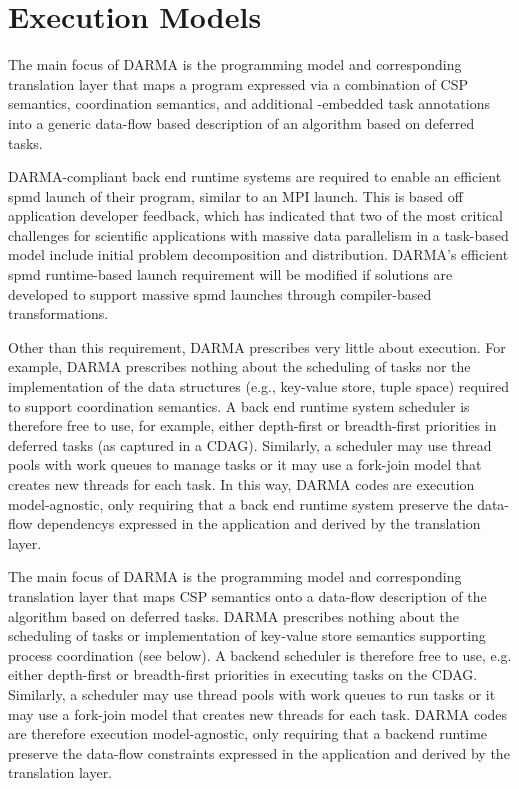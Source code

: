 

\section{Execution Models}
\label{sec:exec_model}
The main focus of \gls{DARMA} is the \gls{programming model} and corresponding
\gls{translation layer} that maps a program expressed via a combination of
\gls{CSP} semantics, \gls{coordination semantics}, and additional \CC{}-embedded task annotations into a generic data-flow based
description of an algorithm based on deferred tasks.

\gls{DARMA}-compliant \gls{back end} \gls{runtime systems} are required to enable an efficient
\gls{spmd} launch of their program, similar to an MPI launch.
This is based off application developer feedback, which has indicated that 
two of the most critical challenges for scientific applications with massive data parallelism in a task-based model
include initial problem decomposition and distribution.
\gls{DARMA}'s efficient \gls{spmd} runtime-based launch requirement 
will be modified if solutions are developed to support massive \gls{spmd} launches
through compiler-based transformations.

Other than this requirement, \gls{DARMA} prescribes very little
about execution.
For example, \gls{DARMA} prescribes nothing about the scheduling of tasks nor the implementation 
of the data structures (e.g., \gls{key-value store}, \gls{tuple space})
  required to support \gls{coordination semantics}.
A \gls{back end} \gls{runtime system} scheduler is therefore free to use, for example,
either depth-first or breadth-first priorities in deferred tasks (as captured
in a \gls{CDAG}).
Similarly, a scheduler may use \glspl{thread pool} with work queues to manage
tasks or it may use a \gls{fork-join} model that creates new threads for each task.
In this way, \gls{DARMA} codes are \gls{execution model}-agnostic, only
requiring that a \gls{back end} \gls{runtime system} preserve the
\glspl{data-flow dependency} expressed in the application and derived by the
\gls{translation layer}.

The main focus of DARMA is the programming model and corresponding translation layer that maps CSP semantics onto a data-flow description of the algorithm based on deferred tasks.
DARMA prescribes nothing about the scheduling of tasks or implementation of key-value store semantics supporting process coordination (see below).
A backend scheduler is therefore free to use, e.g. either depth-first or breadth-first priorities in executing tasks on the CDAG.
Similarly, a scheduler may use thread pools with work queues to run tasks or it may use a fork-join model that creates new threads for each task.
DARMA codes are therefore execution model-agnostic, only requiring that a backend runtime preserve the data-flow constraints expressed in the application and derived by the translation layer.

